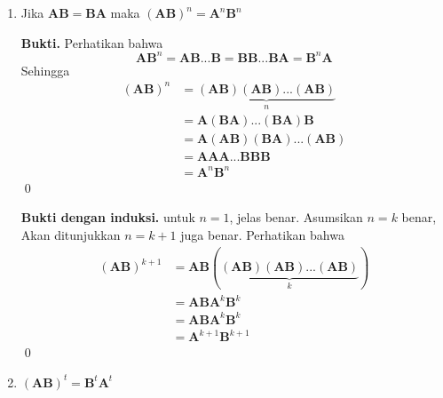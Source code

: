 \documentclass[a4paper, 12pt]{article}
\begin{document}
\begin{enumerate}
    \textbf{Bukti.} Perhatikan bahwa
    \begin{align*}
    \mathbf{A}\mathbf{B} &= \mathbf{A}\\
    \mathbf{A}\mathbf{B}\mathbf{A} &= \mathbf{A}^2\tag{Kalikan A dari kanan}
    \\
    \mathbf{AB}& = \mathbf{A}^2\tag{Substitusi BA = B}
    \end{align*}
    Akibatnya kita punya $\mathbf{A} = \mathbf{A}^2$. Dengan langkah serupa kita dapatkan
     \begin{align*}
    \mathbf{B}\mathbf{A} &= \mathbf{B}\\
    \mathbf{B}\mathbf{A}\mathbf{B} &= \mathbf{B}^2\tag{Kalikan B dari kanan}
    \\
    \mathbf{BA}& = \mathbf{B}^2\tag{Substitusi AB = A}
    \end{align*}
    sehingga terbukti $\mathbf{A},\mathbf{B}$ keduanya idempoten \qed

    \item Jika $\mathbf{AB} = \mathbf{BA} $ maka 
    $(\mathbf{AB})^n = \mathbf{A}^n\mathbf{B}^n $
  
    
    \textbf{Bukti.} Perhatikan bahwa 
    \[\mathbf{AB}^n = \mathbf{A}\mathbf{B}...\mathbf{B} = \mathbf{BB}...\mathbf{BA} = \mathbf{B}^n\mathbf{A} \tag{1}\]
    Sehingga
    \begin{align*}
        (\mathbf{AB})^n & = \underbrace{(\mathbf{AB})(\mathbf{AB})...(\mathbf{AB})}_n
        \\
        & = \mathbf{A}(\mathbf{BA})...(\mathbf{BA})\textbf{B}\\
        & = \mathbf{A}(\mathbf{AB})(\mathbf{BA}) ... (\mathbf{AB}) \\
        & = \mathbf{A}\mathbf{A}\mathbf{A} ... \mathbf{B}\mathbf{B{\mathbf{B}}} \\
        & = \mathbf{A}^n \mathbf{B}^n
    \end{align*}
    \qed
    
    \textbf{Bukti dengan induksi.} untuk $n =1$, jelas benar. Asumsikan $n = k$ benar, Akan ditunjukkan $n = k+1$ juga benar. Perhatikan bahwa
    \begin{align*}
        (\mathbf{A}\mathbf{B})^{k+1} & = \mathbf{AB}(\underbrace{(\mathbf{AB})(\mathbf{AB})...(\mathbf{AB})}_k)\\
        & =\mathbf{AB}\mathbf{A}^k\mathbf{B}^k \tag{Lihat asumsi induksi}
        \\ 
        & =\mathbf{AB}\mathbf{A}^k\mathbf{B}^k \\
        & = \mathbf{A}^{k+1}\mathbf{B}^{k+1}\tag{Substitusi (1)}
    \end{align*}\qed
    \item  $(\mathbf{AB})^t = \mathbf{B}^t \mathbf{A}^t$


\end{enumerate}
\end{document}
